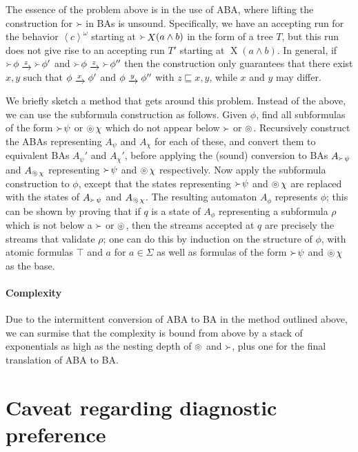 \documentclass[a4paper]{article}
\newcommand{\angl}[1]{\left\langle#1\right\rangle}
\newcommand{\myrightarrow}[1]{\mathrel{\raisebox{-3pt}{$\xrightarrow{#1}$}}}
\newcommand{\composable}{\mathop{\ocircle}\nolimits}
\theoremstyle{definition}
\newcommand{\nxt}{\mathop{X}\nolimits}
\newcommand{\captures}{\mathop{\Yright}}
\begin{document}
\begin{appendix}
The essence of the problem above is in the use of ABA, where lifting the construction for $\captures$ in BAs is unsound. Specifically, we have an accepting run for the behavior $\angl{c}^\omega$ starting at $\captures \nxt (a \wedge b)$ in the form of a tree $T$, but this run does not give rise to an accepting run $T'$ starting at $\nxt (a \wedge b)$. In general, if $\captures \phi \myrightarrow{z} \captures \phi'$ and $\captures \phi \myrightarrow{z} \captures \phi''$ then the construction only guarantees that there exist $x, y$ such that $\phi \myrightarrow{x} \phi'$ and $\phi \myrightarrow{y} \phi''$ with $z \sqsubseteq x, y$, while $x$ and $y$ may differ.

We briefly sketch a method that gets around this problem. Instead of the above, we can use the subformula construction as follows. Given $\phi$, find all subformulas of the form $\captures \psi$ or $\composable \chi$ which do not appear below $\captures$ or $\composable$. Recursively construct the ABAs representing $A_\psi$ and $A_\chi$ for each of these, and convert them to equivalent BAs $A_\psi'$ and $A_\chi'$, before applying the (sound) conversion to BAs $A_{\captures \psi}$ and $A_{\composable \chi}$ representing $\captures \psi$ and $\composable \chi$ respectively. Now apply the subformula construction to $\phi$, except that the states representing $\captures \psi$ and $\composable \chi$ are replaced with the states of $A_{\captures \psi}$ and $A_{\composable \chi}$. The resulting automaton $A_\phi$ represents $\phi$; this can be shown by proving that if $q$ is a state of $A_\phi$ representing a subformula $\rho$ which is not below a $\captures$ or $\composable$, then the streams accepted at $q$ are precisely the streams that validate $\rho$; one can do this by induction on the structure of $\phi$, with atomic formulas $\top$ and $a$ for $a \in \Sigma$ as well as formulas of the form $\captures \psi$ and $\composable \chi$ as the base.

\paragraph{Complexity}
Due to the intermittent conversion of ABA to BA in the method outlined above, we can surmise that the complexity is bound from above by a stack of exponentials as high as the nesting depth of $\composable$ and $\captures$, plus one for the final translation of ABA to BA\@.

\section{Caveat regarding diagnostic preference}%
\label{appendix:caveat}


\end{appendix}
\end{document}
